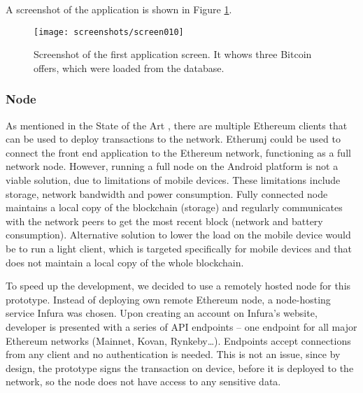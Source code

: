 A screenshot of the application is shown in Figure \ref{fig:app-screenshot}.

\begin{figure}[ht]
    \centering
    \texttt{[image: screenshots/screen010]}
    \caption{Screenshot of the first application screen. It whows three Bitcoin offers, which were loaded from the database.}
    \label{fig:app-screenshot}
\end{figure}
% 
% 
% 
% 
\subsubsection{Node}
As mentioned in the State of the Art \pageref{sec:eth-clients}, there are multiple Ethereum clients that can be used to deploy transactions to the network. Etherumj could be used to connect the front end application to the Ethereum network, functioning as a full network node. However, running a full node on the Android platform is not a viable solution, due to limitations of mobile devices. These limitations include storage, network bandwidth and power consumption\footnotemark.%
% 
Fully connected node maintains a local copy of the blockchain (storage) and regularly communicates with the network peers to get the most recent block (network and battery consumption). Alternative solution to lower the load on the mobile device would be to run a light client\footnotemark, which is targeted specifically for mobile devices and that does not maintain a local copy of the whole blockchain.
% 

To speed up the development, we decided to use a remotely hosted node for this prototype. Instead of deploying own remote Ethereum node, a node-hosting service Infura was chosen. Upon creating an account on Infura’s website, developer is presented with a series of API endpoints – one endpoint for all major Ethereum networks (Mainnet, Kovan, Rynkeby…). Endpoints accept connections from any client and no authentication is needed. This is not an issue, since by design, the prototype signs the transaction on device, before it is deployed to the network, so the node does not have access to any sensitive data.


